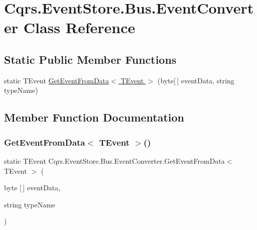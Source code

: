 \hypertarget{classCqrs_1_1EventStore_1_1Bus_1_1EventConverter}{}\section{Cqrs.\+Event\+Store.\+Bus.\+Event\+Converter Class Reference}
\label{classCqrs_1_1EventStore_1_1Bus_1_1EventConverter}
\subsection*{Static Public Member Functions}
\begin{DoxyCompactItemize}
\item 
static T\+Event \hyperlink{classCqrs_1_1EventStore_1_1Bus_1_1EventConverter_a22d7d8455731564574dc9684c272e6d2}{Get\+Event\+From\+Data$<$ T\+Event $>$} (byte\mbox{[}$\,$\mbox{]} event\+Data, string type\+Name)
\end{DoxyCompactItemize}


\subsection{Member Function Documentation}
\mbox{\label{classCqrs_1_1EventStore_1_1Bus_1_1EventConverter_a22d7d8455731564574dc9684c272e6d2}} 
\subsubsection{\texorpdfstring{Get\+Event\+From\+Data$<$ T\+Event $>$()}{GetEventFromData< TEvent >()}}
{\footnotesize\ttfamily static T\+Event Cqrs.\+Event\+Store.\+Bus.\+Event\+Converter.\+Get\+Event\+From\+Data$<$ T\+Event $>$ (\begin{DoxyParamCaption}\item[{byte \mbox{[}$\,$\mbox{]}}]{event\+Data,  }\item[{string}]{type\+Name }\end{DoxyParamCaption})\hspace{0.3cm}{\ttfamily [static]}}


